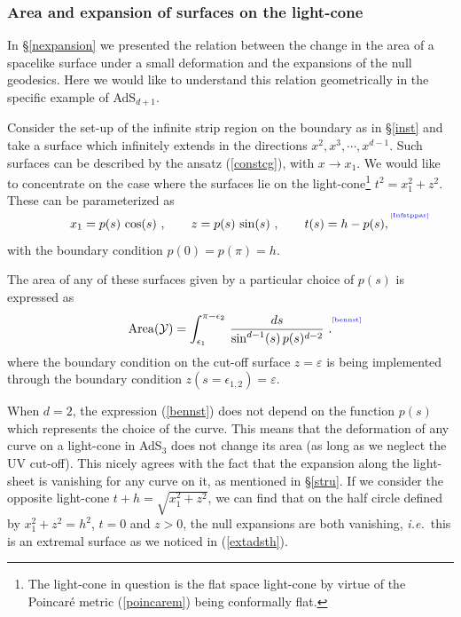 \documentclass[12pt]{article}
\def\sec#1{\S \;\ref{#1}}
\def\req#1{(\ref{#1})}
\def\ie{{\it i.e.}}
\def\eps{\epsilon}
\def\veps{\varepsilon}
\def\s{\sigma}
\def\CY{{\cal Y}}
\def\f#1#2{{\frac{#1}{#2}}}
\def\f#1#2{{\frac{#1}{#2}}}
\def\Label#1{\label{#1}%
{ \color{blue}{\smash{\hbox to0pt{\raise2ex\hbox{\tiny[#1]}\hss}}}}}
\def\Lms{\CY}
\def\area#1{{\rm Area}(#1)}
\def\cof{{\veps}}
\def\s{\sqrt}
\def\f {\frac}
\begin{document}
\subsubsection{Area and expansion of surfaces on the light-cone}
\label{Arex}

In \sec{nexpansion} we presented the relation between
the change in the  area of a spacelike surface under a small deformation
and the expansions of the null geodesics. Here we would like to
understand this relation geometrically in the specific example of
AdS$_{d+1}$.

Consider the set-up of the infinite strip region on the boundary as
in \sec{inst} and take a surface which infinitely extends in the
directions  $x^2,x^3,\cdots,x^{d-1}$. Such surfaces can be
described by the ansatz \req{constcg}, with $x\to x_1$. We would
like to  concentrate on the case where the surfaces lie on the
light-cone\footnote{The light-cone in question is the flat space
light-cone by virtue of the Poincar\'e metric \req{poincarem} being
conformally flat.} $t^2=x_1^2+z^2$. These can be  parameterized as
%
\begin{equation}
x_1= p(s)\, \cos(s)\ , \qquad  z=p(s)\, \sin(s) \ , \qquad t(s)
=h-p(s) , \Label{Infstppar}
\end{equation}
%
with the boundary condition $p(0)=p(\pi)=h$. 

The area of any of these surfaces given by a particular choice of $p(s)$ is expressed as
%
\begin{equation}
\area{\Lms} =\int^{\pi-\epsilon_2} _{\epsilon_1}\,
\f{ds}{\sin^{d-1}(s)\, p(s)^{d-2}} \ . \Label{bennst}
\end{equation}
%
where the boundary condition on the cut-off surface $z=\cof$ is being
implemented through the boundary condition $z(s = \eps_{1,2}) = \cof$.

When $d=2$, the expression \req{bennst} does not depend on the
function $p(s)$ which represents the choice of the curve. This means
that the deformation of any curve on a light-cone in AdS$_3$ does
not change its area (as long as we neglect the UV cut-off). This
nicely agrees with the fact that the expansion along the light-sheet
is vanishing for any curve on it, as mentioned in \sec{stru}. If we
consider the opposite light-cone $t+h=\s{x_1^2+z^2}$, we can find
that on the half circle defined by $x_1^2+z^2=h^2$, $t=0$ and $z>0$,
the null expansions are both vanishing, \ie\ this is an extremal
surface as we noticed in \req{extadsth}. 
\end{document}
